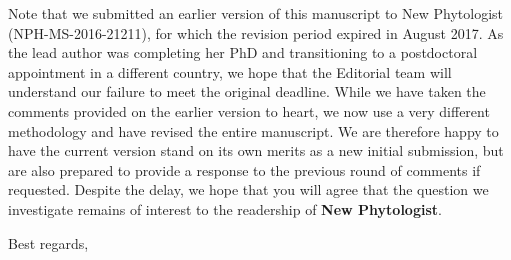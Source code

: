 \documentclass[12pt]{letter}
\begin{document}
\begin{letter}
\begin{enumerate}
	\end{enumerate}

	Note that we submitted an earlier version of this manuscript to New Phytologist (NPH-MS-2016-21211), for which the revision period expired in August 2017. As the lead author was completing her PhD and transitioning to a postdoctoral appointment in a different country, we hope that the Editorial team will understand our failure to meet the original deadline. While we have taken the comments provided on the earlier version to heart, we now use a very different methodology and have revised the entire manuscript. We are therefore happy to have the current version stand on its own merits as a new initial submission, but are also prepared to provide a response to the previous round of comments if requested. Despite the delay, we hope that you will agree that the question we investigate remains of interest to the readership of \textbf{New Phytologist}.









\closing{Best regards,}



\end{letter}
\end{document}
